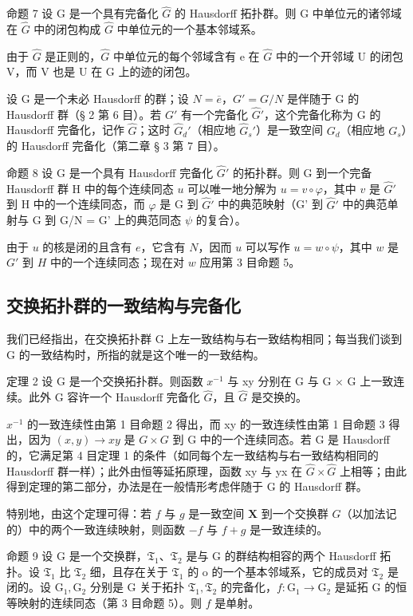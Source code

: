 命题 7 设 G 是一个具有完备化 \(\hat{G}\) 的 Hausdorff 拓扑群。则 G 中单位元的诸邻域在 \(\hat{G}\) 中的闭包构成 \(\hat{G}\) 中单位元的一个基本邻域系。

由于 \(\hat{G}\) 是正则的，\(\hat{G}\) 中单位元的每个邻域含有 e 在 \(\hat{G}\) 中的一个开邻域 U 的闭包 V，而 V 也是 U 在 G 上的迹的闭包。

设 G 是一个未必 Hausdorff 的群；设 \(N = \overline{e}\)，\(G' = G/N\) 是伴随于 G 的 Hausdorff 群（§ 2 第 6 目）。若 \(G'\) 有一个完备化 \(\hat{G}'\)，这个完备化称为 G 的 Hausdorff 完备化，记作 \(\hat{G}\)；这时 \(\hat{G}_{d}'\)（相应地 \(\hat{G}_{s}'\)）是一致空间 \(G_{d}\)（相应地 \(G_{s}\)）的 Hausdorff 完备化（第二章 § 3 第 7 目）。

命题 8 设 G 是一个具有 Hausdorff 完备化 \(\hat{G}'\) 的拓扑群。则 G 到一个完备 Hausdorff 群 H 中的每个连续同态 \(u\) 可以唯一地分解为 \(u = v \circ \varphi\)，其中 \(v\) 是 \(\hat{G}'\) 到 H 中的一个连续同态，而 \(\varphi\) 是 G 到 \(\hat{G}'\) 中的典范映射（G' 到 \(\hat{G}'\) 中的典范单射与 G 到 G/N = G' 上的典范同态 \(\psi\) 的复合）。

由于 \(u\) 的核是闭的且含有 \(e\)，它含有 \(N\)，因而 \(u\) 可以写作 \(u = w \circ \psi\)，其中 \(w\) 是 \(G'\) 到 \(H\) 中的一个连续同态；现在对 \(w\) 应用第 3 目命题 5。

\subsection{交换拓扑群的一致结构与完备化}

我们已经指出，在交换拓扑群 G 上左一致结构与右一致结构相同；每当我们谈到 G 的一致结构时，所指的就是这个唯一的一致结构。

定理 2 设 G 是一个交换拓扑群。则函数 \(x^{-1}\) 与 xy 分别在 G 与 G × G 上一致连续。此外 G 容许一个 Hausdorff 完备化 \(\hat{G}\)，且 \(\hat{G}\) 是交换的。

\(x^{-1}\) 的一致连续性由第 1 目命题 2 得出，而 xy 的一致连续性由第 1 目命题 3 得出，因为 \((x, y) \to xy\) 是 \(G \times G\) 到 G 中的一个连续同态。若 G 是 Hausdorff 的，它满足第 4 目定理 1 的条件（如同每个左一致结构与右一致结构相同的 Hausdorff 群一样）；此外由恒等延拓原理，函数 xy 与 yx 在 \(\hat{G} \times \hat{G}\) 上相等；由此得到定理的第二部分，办法是在一般情形考虑伴随于 G 的 Hausdorff 群。

特别地，由这个定理可得：若 \(f\) 与 \(g\) 是一致空间 \(\mathbf{X}\) 到一个交换群 \(G\)（以加法记的）中的两个一致连续映射，则函数 \(-f\) 与 \(f + g\) 是一致连续的。

命题 9 设 G 是一个交换群，\(\mathfrak{T}_1\)、\(\mathfrak{T}_2\) 是与 G 的群结构相容的两个 Hausdorff 拓扑。设 \(\mathfrak{T}_1\) 比 \(\mathfrak{T}_2\) 细，且存在关于 \(\mathfrak{T}_1\) 的 o 的一个基本邻域系，它的成员对 \(\mathfrak{T}_2\) 是闭的。设 \(\mathrm{G}_1, \mathrm{G}_2\) 分别是 G 关于拓扑 \(\mathfrak{T}_1, \mathfrak{T}_2\) 的完备化，\(f: \mathrm{G}_1 \to \mathrm{G}_2\) 是延拓 G 的恒等映射的连续同态（第 3 目命题 5）。则 \(f\) 是单射。

